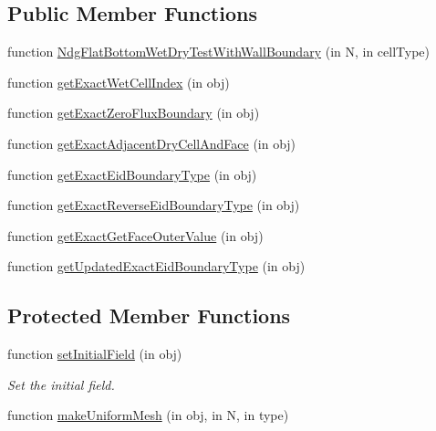 \subsection*{Public Member Functions}
\begin{DoxyCompactItemize}
\item 
function \hyperlink{class_ndg_flat_bottom_wet_dry_test_with_wall_boundary_a08d8314fb14bb07e80a332e37ef9c57b}{Ndg\+Flat\+Bottom\+Wet\+Dry\+Test\+With\+Wall\+Boundary} (in N, in cell\+Type)
\item 
function \hyperlink{class_ndg_flat_bottom_wet_dry_test_with_wall_boundary_a336e0177d2ab2a5e2c29205d667e66d2}{get\+Exact\+Wet\+Cell\+Index} (in obj)
\item 
function \hyperlink{class_ndg_flat_bottom_wet_dry_test_with_wall_boundary_acf53cf3a34fda6a96989c598cd5c6523}{get\+Exact\+Zero\+Flux\+Boundary} (in obj)
\item 
function \hyperlink{class_ndg_flat_bottom_wet_dry_test_with_wall_boundary_a0d8db56f9315ecbb99e49a6d44f23bc8}{get\+Exact\+Adjacent\+Dry\+Cell\+And\+Face} (in obj)
\item 
function \hyperlink{class_ndg_flat_bottom_wet_dry_test_with_wall_boundary_a77a9812b3942c836319d50a73e830f6f}{get\+Exact\+Eid\+Boundary\+Type} (in obj)
\item 
function \hyperlink{class_ndg_flat_bottom_wet_dry_test_with_wall_boundary_aac5dbe6e5a18cbc6699a56af4fc0d224}{get\+Exact\+Reverse\+Eid\+Boundary\+Type} (in obj)
\item 
function \hyperlink{class_ndg_flat_bottom_wet_dry_test_with_wall_boundary_acca53b199cf4abd00d8a8a2f57e1d830}{get\+Exact\+Get\+Face\+Outer\+Value} (in obj)
\item 
function \hyperlink{class_ndg_flat_bottom_wet_dry_test_with_wall_boundary_a724c9c9380860469e1437bc07a281a2a}{get\+Updated\+Exact\+Eid\+Boundary\+Type} (in obj)
\end{DoxyCompactItemize}
\subsection*{Protected Member Functions}
\begin{DoxyCompactItemize}
\item 
function \hyperlink{class_ndg_flat_bottom_wet_dry_test_with_wall_boundary_a6e57eda0151e5482fc3a4360c27d4f2c}{set\+Initial\+Field} (in obj)
\begin{DoxyCompactList}\small\item\em Set the initial field. \end{DoxyCompactList}\item 
function \hyperlink{class_ndg_flat_bottom_wet_dry_test_with_wall_boundary_aace0c6dc8af6ecc5917f447195ce6990}{make\+Uniform\+Mesh} (in obj, in N, in type)
\end{DoxyCompactItemize}
